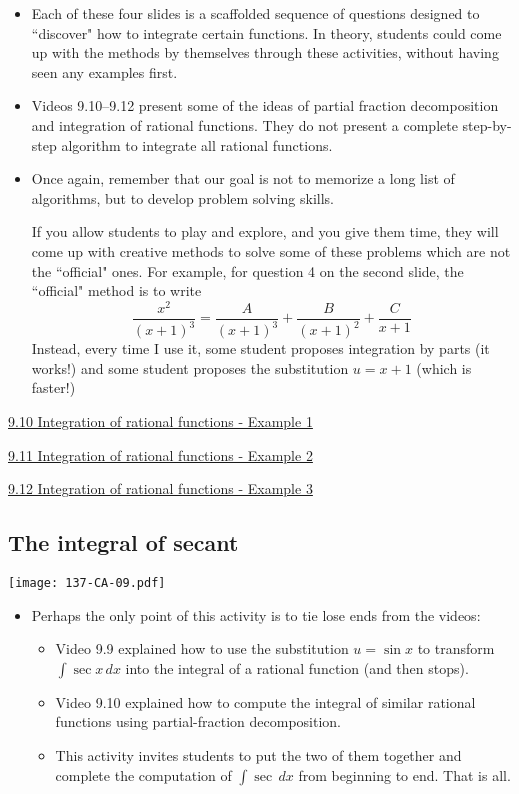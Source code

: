 \documentclass[11pt]{article}
\newcommand {\DS} [1] {${\displaystyle #1}$}
\newcommand{\nl}{\hfill \vspace{-1.1\baselineskip}} %
\newcommand{\vx}{\hspace{8mm} \href{https://www.youtube.com/watch?v=w-T90XSM90s&list=PLlwePzQY_wW_DPAQSBjQmMs0hF8T7yVkF&index=10}{9.10 Integration of rational functions - Example 1}}
\newcommand{\vxi}{\hspace{8mm} \href{https://www.youtube.com/watch?v=XwuohSB1e5w&list=PLlwePzQY_wW_DPAQSBjQmMs0hF8T7yVkF&index=11}{9.11 Integration of rational functions - Example 2}}
\newcommand{\vxii}{\hspace{8mm} \href{https://www.youtube.com/watch?v=NjmH5KjYS2k&list=PLlwePzQY_wW_DPAQSBjQmMs0hF8T7yVkF&index=12}{9.12 Integration of rational functions - Example 3}}
\begin{document}
\begin{comments}
\nl
	\begin{itemize}
		\item Each of these four slides is a scaffolded sequence of questions designed to ``discover" how to integrate certain functions.  In theory, students could come up with the methods by themselves through these activities, without having seen any examples first.
		\item Videos 9.10--9.12 present some of the ideas of partial fraction decomposition and integration of rational functions.  They do not present a complete step-by-step algorithm to integrate all rational functions.
		\item Once again, remember that our goal is not to memorize a long list of algorithms, but to develop problem solving skills.
		
		 If you allow students to play and explore, and you give them time, they will come up with creative methods to solve some of these problems which are not the ``official" ones.  For example, for question 4 on the second slide, the ``official" method is to write
			$$
				\frac{x^2}{(x+1)^3} = \frac{A}{(x+1)^3} + \frac{B}{(x+1)^2}+\frac{C}{x+1}
			$$
		Instead, every time I use it, some student proposes integration by parts (it works!) and some student proposes the substitution \DS{u=x+1} (which is faster!)
	\end{itemize}
\end{comments}

\newpage
\begin{videos}
\vx

\vxi

\vxii
\end{videos}

\newpage
\subsection{The integral of secant}

\begin{center}
{ \texttt{[image: 137-CA-09.pdf]}} 
\end{center}

\begin{comments}
\nl
	\begin{itemize}
		\item Perhaps the only point of this activity is to tie lose ends from the videos:
			\begin{itemize}
				\item Video 9.9 explained how to use the substitution \DS{u=\sin x} to transform \DS{\int \sec x \, dx} into the integral of a rational function (and then stops).
				\item Video 9.10 explained how to compute the integral of similar rational functions using partial-fraction decomposition.
				\item This activity invites students to put the two of them together and complete the computation of \DS{\int \sec \, dx} from beginning to end.  That is all.  
			\end{itemize}
	\end{itemize}
\end{comments}
\end{document}
